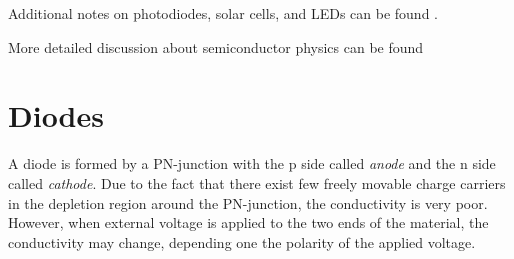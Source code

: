 Additional notes on photodiodes, solar cells, and LEDs can be found
.

More detailed discussion about semiconductor physics can be found

\section*{Diodes}

A diode is formed by a PN-junction with the p side called {\em anode} and the
n side called {\em cathode}. Due to the fact that there exist few freely movable 
charge carriers in the depletion region around the PN-junction, the conductivity
is very poor. However, when external voltage is applied to the two ends of the 
material, the conductivity may change, depending one the polarity of the applied
voltage.


